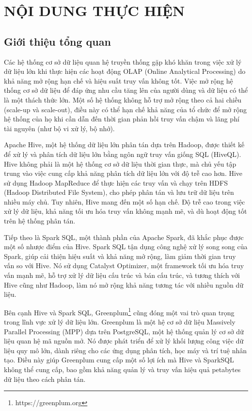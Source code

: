 \documentclass{article}[14pt]
\begin{document}
    \section{NỘI DUNG THỰC HIỆN}
    {

    
    \subsection{Giới thiệu tổng quan }
    
Các hệ thống cơ sở dữ liệu quan hệ truyền thống gặp khó khăn trong việc xử lý dữ liệu lớn khi thực hiện các hoạt động OLAP (Online Analytical Processing) do khả năng mở rộng hạn chế và hiệu suất truy vấn không tốt. Việc mở rộng hệ thống cơ sở dữ liệu để đáp ứng nhu cầu tăng lên của người dùng và dữ liệu có thể là một thách thức lớn. Một số hệ thống không hỗ trợ mở rộng theo cả hai chiều (scale-up và scale-out), điều này có thể hạn chế khả năng của tổ chức để mở rộng hệ thống của họ khi cần dẫn đến thời gian phản hồi truy vấn chậm và lãng phí tài nguyên (như bộ vi xử lý, bộ nhớ).


Apache Hive\cite{aluko2019big}, một hệ thống dữ liệu lớn phân tán dựa trên Hadoop, được thiết kế để xử lý và phân tích dữ liệu lớn bằng ngôn ngữ truy vấn giống SQL (HiveQL). Hive không phải là một hệ thống cơ sở dữ liệu thời gian thực, mà chủ yếu tập trung vào việc cung cấp khả năng phân tích dữ liệu lớn với độ trễ cao hơn. Hive sử dụng Hadoop MapReduce để thực hiện các truy vấn và chạy trên HDFS (Hadoop Distributed File System), cho phép phân tán và lưu trữ dữ liệu trên nhiều máy chủ. Tuy nhiên, Hive mang đến một số hạn chế. Độ trễ cao trong việc xử lý dữ liệu, khả năng tối ưu hóa truy vấn không mạnh mẽ, và dù hoạt động tốt trên hệ thống phân tán.

Tiếp theo là Spark SQL\cite{armbrust2015spark}, một thành phần của Apache Spark, đã khắc phục được một số nhược điểm của Hive. Spark SQL tận dụng công nghệ xử lý song song của Spark, giúp cải thiện hiệu suất và khả năng mở rộng, làm giảm thời gian truy vấn so với Hive. Nó sử dụng Catalyst Optimizer, một framework tối ưu hóa truy vấn mạnh mẽ, hỗ trợ xử lý dữ liệu cấu trúc và bán cấu trúc, và tương thích với Hive cũng như Hadoop, làm nó mở rộng khả năng tương tác với nhiều nguồn dữ liệu.

Bên cạnh Hive và Spark SQL, Greenplum\footnote{https://greenplum.org} cũng đóng một vai trò quan trọng trong lĩnh vực xử lý dữ liệu lớn. Greenplum là một hệ cơ sở dữ liệu Massively Parallel Processing (MPP) dựa trên PostgreSQL, một hệ thống quản lý cơ sở dữ liệu quan hệ mã nguồn mở. Nó được phát triển để xử lý khối lượng công việc dữ liệu quy mô lớn, dành riêng cho các ứng dụng phân tích, học máy và trí tuệ nhân tạo. Điều này giúp Greenplum cung cấp một số lợi ích mà Hive và SparkSQL không thể cung cấp, bao gồm khả năng quản lý và truy vấn hiệu quả petabytes dữ liệu theo cách phân tán.


}
\end{document}
